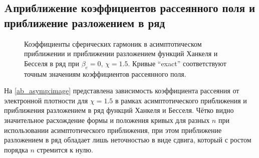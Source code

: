 \subsection*{A приближение коэффициентов рассеянного поля и приближение разложением в ряд}

\begin{figure}[H]
    \hfil
    \caption{Коэффициенты сферических гармоник в асимптотическом приближении и приближении разложением функций Ханкеля и Бесселя в ряд при $\beta_e = 0$, $\chi = 1.5$. Кривые ``exact'' соответствуют точным значениям коэффициентов рассеянного поля.}\label{ab_asymp:image}
\end{figure}

На \autoref{ab_asymp:image} представлена зависимость коэффициента рассеяния от электронной плотности для $\chi = 1.5$ в рамках асимптотического приближения и приближения разложением в ряд функций Ханкеля и Бесселя. Чётко видно значительное расхождение формы и положения кривых для разных $n$ при использовании асимптотического приближения, при этом приближение разложением в ряд обладает лишь неточностью в виде сдвига, который с ростом порядка $n$ стремится к нулю.